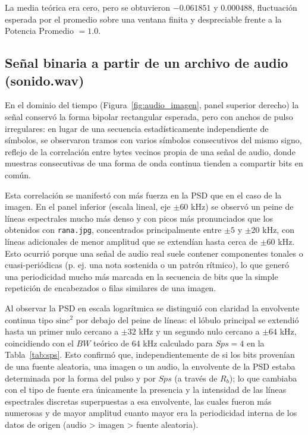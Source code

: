 \documentclass[twocolumn]{IEEEtran}
\begin{document}
La media teórica era cero, pero se obtuvieron $-0.061851$ y $0.000488$, fluctuación esperada por el promedio sobre una ventana finita y despreciable frente a la Potencia Promedio $=1.0$.

\subsection{Señal binaria a partir de un archivo de audio (sonido.wav)}


En el dominio del tiempo (Figura~\ref{fig:audio_imagen}, panel superior derecho) la señal conservó la forma bipolar rectangular esperada, pero con anchos de pulso irregulares: en lugar de una secuencia estadísticamente independiente de símbolos, se observaron tramos con varios símbolos consecutivos del mismo signo, reflejo de la correlación entre bytes vecinos propia de una señal de audio, donde muestras consecutivas de una forma de onda continua tienden a compartir bits en común.

Esta correlación se manifestó con más fuerza en la PSD que en el caso de la imagen. En el panel inferior (escala lineal, eje $\pm60$ kHz) se observó un peine de líneas espectrales mucho más denso y con picos más pronunciados que los obtenidos con \texttt{rana.jpg}, concentrados principalmente entre $\pm 5$ y $\pm 20$ kHz, con líneas adicionales de menor amplitud que se extendían hasta cerca de $\pm60$ kHz. Esto ocurrió porque una señal de audio real suele contener componentes tonales o cuasi-periódicas (p. ej. una nota sostenida o un patrón rítmico), lo que generó una periodicidad mucho más marcada en la secuencia de bits que la simple repetición de encabezados o filas similares de una imagen.

Al observar la PSD en escala logarítmica se distinguió con claridad la envolvente continua tipo $\text{sinc}^2$ por debajo del peine de líneas: el lóbulo principal se extendió hasta un primer nulo cercano a $\pm 32$ kHz y un segundo nulo cercano a $\pm 64$ kHz, coincidiendo con el $BW$ teórico de 64 kHz calculado para $Sps=4$ en la Tabla~\ref{tab:sps}. Esto confirmó que, independientemente de si los bits provenían de una fuente aleatoria, una imagen o un audio, la envolvente de la PSD estaba determinada por la forma del pulso y por $Sps$ (a través de $R_b$); lo que cambiaba con el tipo de fuente era únicamente la presencia y la intensidad de las líneas espectrales discretas superpuestas a esa envolvente, las cuales fueron más numerosas y de mayor amplitud cuanto mayor era la periodicidad interna de los datos de origen (audio > imagen > fuente aleatoria).
\end{document}
